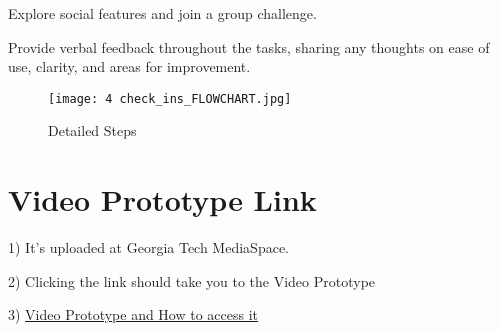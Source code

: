 \documentclass[
	letterpaper, %
]{jdf}
\begin{document}
Explore social features and join a group challenge.

Provide verbal feedback throughout the tasks, sharing any thoughts on ease of use, clarity, and areas for improvement.

\begin{figure}
    \centering
    \texttt{[image: 4 check\_ins\_FLOWCHART.jpg]}
    \caption{Detailed Steps}
    \label{fig:enter-label}
\end{figure}

\newpage
\section{Video Prototype Link}
1) It's uploaded at Georgia Tech MediaSpace. 

2) Clicking the link should take you to the Video Prototype 

3) \href{https://mediaspace.gatech.edu/media/Video+Prototype+for+HCI+Final+Project%2C+Spring+2025/1_o8th4jxo}{\underline{Video Prototype and How to access it}}
\end{document}
